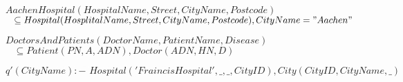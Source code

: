 \begin{exercise}{6}

  \begin{subexercise}
    $AachenHospital(HospitalName, Street, CityName, Postcode)$ \\
    $\;\;\;\subseteq Hospital(HosplitalName, Street, CityName, Postcode ), CityName = "Aachen"$
  \end{subexercise}
  \begin{subexercise}
    $DoctorsAndPatients(DoctorName, PatientName, Disease)$ \\
    $\;\;\;\subseteq Patient( PN, A, ADN), Doctor(ADN, HN, D )$
  \end{subexercise}
  \begin{subexercise}
  \end{subexercise}
  \begin{subexercise}
    $q\prime(CityName):-\,\,Hospital('FraincisHospital',\_,\_,CityID),City(CityID,CityName,\_)$
  \end{subexercise}
\end{exercise}
